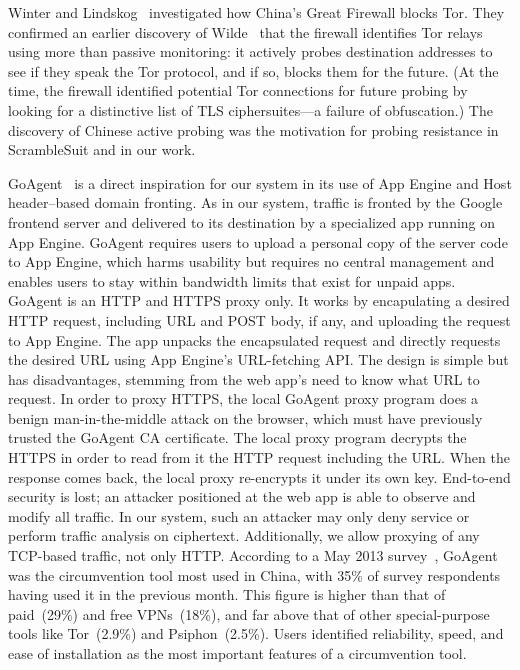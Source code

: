 \documentclass{article}
\begin{document}
Winter and Lindskog~\cite{foci12-winter} investigated how China's Great Firewall blocks Tor.
They confirmed an earlier discovery of Wilde~\cite{wilde} that the firewall identifies Tor relays using more than passive monitoring:
it actively probes destination addresses to see if they speak the Tor protocol, and if so,
blocks them for the future.
(At the time, the firewall identified potential Tor connections for future probing by looking for a distinctive
list of TLS ciphersuites---a failure of obfuscation.) %
The discovery of Chinese active probing was the motivation for probing resistance in ScrambleSuit
and in our work.

GoAgent~\cite{goagent} is a direct inspiration for our system in its use of App
Engine and Host header--based domain fronting.
As in our system, traffic is fronted by the Google frontend server
and delivered to its destination by a specialized app running on App Engine.
GoAgent requires users to upload a personal copy of the server code to App Engine,
which harms usability but requires no central management
and enables users to stay within bandwidth limits that exist for unpaid apps.
GoAgent is an HTTP and HTTPS proxy only.
It works by encapulating a desired HTTP request, including URL and POST body, if any,
and uploading the request to App Engine.
The app unpacks the encapsulated request and directly requests the desired URL using
App Engine's URL-fetching API.
The design is simple but has disadvantages, stemming from the web app's
need to know what URL to request.
In order to proxy HTTPS, the local GoAgent proxy program does a benign man-in-the-middle
attack on the browser, which must have previously trusted the GoAgent CA certificate.
The local proxy program decrypts the HTTPS in order to read from it the HTTP request including the URL.
When the response comes back, the local proxy re-encrypts it under its own key.
End-to-end security is lost; an attacker positioned at the web app
is able to observe and modify all traffic.
In our system, such an attacker may only deny service or perform traffic analysis on ciphertext.
Additionally, we allow proxying of any TCP-based traffic, not only HTTP.
According to a May 2013 survey~\cite{collateral-freedom},
GoAgent was the circumvention tool most used in
China, with 35\% of survey respondents having used it in the previous month.
This figure is higher than that of paid~(29\%) and free VPNs~(18\%), and far
above that of other special-purpose tools like Tor~(2.9\%) and Psiphon~(2.5\%).
Users identified reliability, speed, and ease of installation as the most important features of a circumvention tool.
\end{document}
